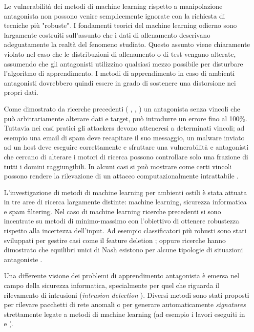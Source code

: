 Le vulnerabilità dei metodi di machine learning rispetto a manipolazione antagonista non possono venire semplicemente ignorate con la richiesta di tecniche più "robuste". I fondamenti teorici del machine learning odierno sono largamente costruiti sull'assunto che i dati di allenamento descrivano adeguatamente la realtà del fenomeno studiato. Questo assunto viene chiaramente violato nel caso che le distribuzioni di allenamento o di test vengano alterate, assumendo che gli antagonisti utilizzino qualsiasi mezzo possibile per disturbare l'algoritmo di apprendimento. I metodi di apprendimento in caso di ambienti antagonisti dovrebbero quindi essere in grado di sostenere una distorsione nei propri dati.

Come dimostrato da ricerche precedenti ( \cite{kearnsli}, \cite{Auer2002}, \cite{paclearning} ) un antagonista senza vincoli che può arbitrariamente alterare dati e target, può introdurre un errore fino al 100\%. Tuttavia nei casi pratici gli attackers devono atteneresi a determinati vincoli; ad esempio una email di spam deve recapitare il suo messaggio, un malware inviato ad un host deve eseguire correttamente e sfruttare una vulnerabilità e antagonisti che cercano di alterare i motori di ricerca possono controllare solo una frazione di tutti i domini raggiungibili. In alcuni casi si può mostrare come certi vincoli possono rendere la rilevazione di un attacco computazionalmente intrattabile \cite{fogla}.

L'investigazione di metodi di machine learning per ambienti ostili è stata attuata in tre aree di ricerca largamente distinte: machine learning, sicurezza informatica e spam filtering. Nel caso di machine learning ricerche precedenti si sono incentrate su metodi di minimo-massimo con l'obiettivo di ottenere robustezza rispetto alla incertezza dell'input. Ad esempio classificatori più robusti sono stati sviluppati per gestire casi come il feature deletion \cite{globerson} ; oppure ricerche hanno dimostrato che equilibri unici di Nash esistono per alcune tipologie di situazioni antagoniste \cite{nash} .

Una differente visione dei problemi di apprendimento antagonista è emersa nel campo della sicurezza informatica, specialmente per quel che riguarda il rilevamento di intrusioni (\textit{intrusion detection} ). Diversi metodi sono stati proposti per rilevare pacchetti di rete anomali o per generare automaticamente \textit{signatures} strettamente legate a metodi di machine learning (ad esempio i lavori eseguiti in \cite{wangstolfo} e \cite{wang2006} ).

